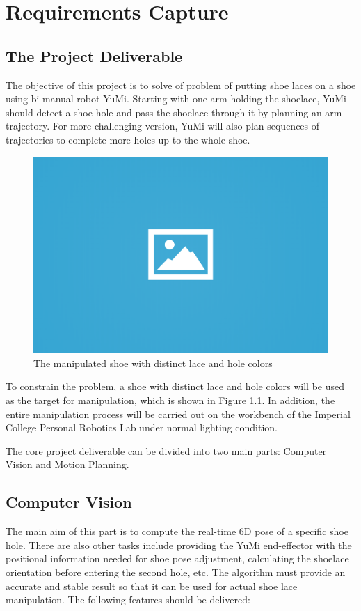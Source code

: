 \chapter{Requirements Capture}

\section{The Project Deliverable}
The objective of this project is to solve of problem of putting shoe laces on a shoe using bi-manual robot YuMi. Starting with one arm holding the shoelace, YuMi should detect a shoe hole and pass the shoelace through it by planning an arm trajectory. For more challenging version, YuMi will also plan sequences of trajectories to complete more holes up to the whole shoe.

\begin{figure}[H]
\centering
\includegraphics[width = 0.5\columnwidth]{images/ph.png}
\caption{The manipulated shoe with distinct lace and hole colors}
\label{shoe}
\end{figure}

To constrain the problem, a shoe with distinct lace and hole colors will be used as the target for manipulation, which is shown in Figure \ref{shoe}. In addition, the entire manipulation process will be carried out on the workbench of the Imperial College Personal Robotics Lab under normal lighting condition.

The core project deliverable can be divided into two main parts: Computer Vision and Motion Planning.

\section{Computer Vision}
The main aim of this part is to compute the real-time 6D pose of a specific shoe hole. There are also other tasks include providing the YuMi end-effector with the positional information needed for shoe pose adjustment, calculating the shoelace orientation before entering the second hole, etc. The algorithm must provide an accurate and stable result so that it can be used for actual shoe lace manipulation. The following features should be delivered:

